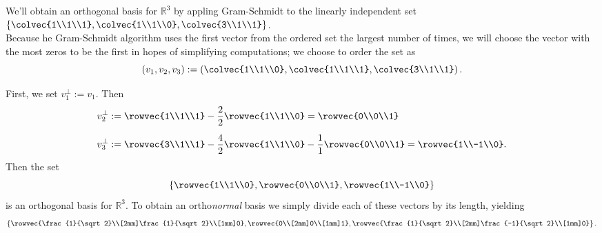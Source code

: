 \begin{example}
We'll  obtain an orthogonal basis for $\mathbb{R}^3$ by appling Gram-Schmidt to the linearly independent set 
$\left\{\colvec{1\\1\\1}, \colvec{1\\1\\0},\colvec{3\\1\\1} \right\}$.\\

Because he Gram-Schmidt algorithm uses the first vector from the ordered set the largest number of times, we will choose the vector with the most zeros to be the first in hopes of simplifying computations; we choose to order the set as
\[( v_1,v_2,v_3)
:= \left( \colvec{1\\1\\0}, \colvec{1\\1\\1},\colvec{3\\1\\1} \right).\]

First, we set $v_1^\perp:=v_1$.  Then
\begin{align*}
v_2^\perp&:= \rowvec{1\\1\\1} - \frac{2}{2}\rowvec{1\\1\\0} = \rowvec{0\\0\\1} \\[2mm]
v_3^\perp&:= \rowvec{3\\1\\1} - \frac{4}{2}\rowvec{1\\1\\0} - \frac{1}{1}\rowvec{0\\0\\1} = \rowvec{1\\-1\\0}. 
\end{align*}
Then the set
\[
\left\{ \rowvec{1\\1\\0},\rowvec{0\\0\\1},\rowvec{1\\-1\\0}\right\}
\]
is an orthogonal basis for $\mathbb{R}^3$.  To obtain an ortho{\itshape normal} basis we simply divide each of these vectors by its length, yielding
\[
\left\{ \rowvec{\frac{1}{\sqrt2}\\[2mm]\frac{1}{\sqrt2}\\[1mm]0},\rowvec{0\\[2mm]0\\[1mm]1},\rowvec{\frac{1}{\sqrt2}\\[2mm]\frac{-1}{\sqrt2}\\[1mm]0}\right\}.
\]
\end{example}

